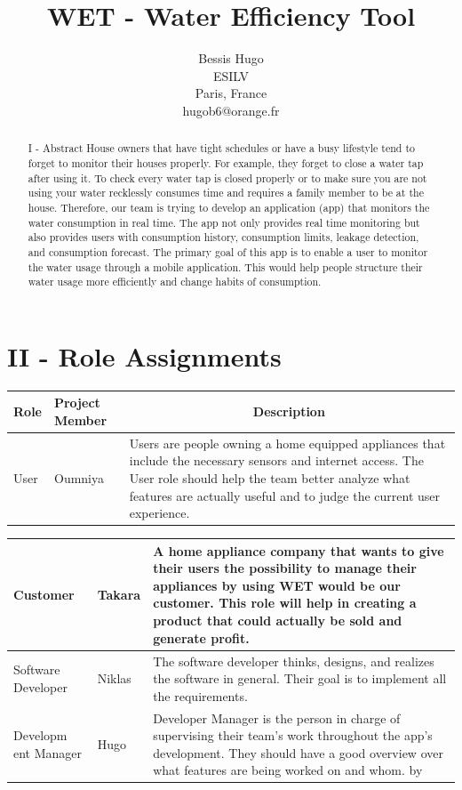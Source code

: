 \documentclass[10pt]{article}
\title{WET - Water Efficiency Tool }
\author{Bessis Hugo\\
ESILV\\
Paris, France\\
hugob6@orange.fr}
\date{}
\begin{document}
\maketitle


\begin{abstract}
I - Abstract House owners that have tight schedules or have a busy lifestyle tend to forget to monitor their houses properly. For example, they forget to close a water tap after using it. To check every water tap is closed properly or to make sure you are not using your water recklessly consumes time and requires a family member to be at the house. Therefore, our team is trying to develop an application (app) that monitors the water consumption in real time. The app not only provides real time monitoring but also provides users with consumption history, consumption limits, leakage detection, and consumption forecast. The primary goal of this app is to enable a user to monitor the water usage through a mobile application. This would help people structure their water usage more efficiently and change habits of consumption.
\end{abstract}

\section{II - Role Assignments}
\begin{tabular}{|l|l|l|}
\hline
Role & Project Member & \multicolumn{1}{|c|}{Description} \\
\hline
User & Oumniya & Users are people owning a home equipped appliances that include the necessary sensors and internet access. The User role should help the team better analyze what features are actually useful and to judge the current user experience. \\
\hline
\end{tabular}

\begin{tabular}{|l|l|l|}
\hline
Customer & Takara & A home appliance company that wants to give their users the possibility to manage their appliances by using WET would be our customer. This role will help in creating a product that could actually be sold and generate profit. \\
\hline
Software Developer & Niklas & The software developer thinks, designs, and realizes the software in general. Their goal is to implement all the requirements. \\
\hline
Developm ent Manager & Hugo & Developer Manager is the person in charge of supervising their team's work throughout the app's development. They should have a good overview over what features are being worked on and whom. by \\
\hline
\end{tabular}
\end{document}
